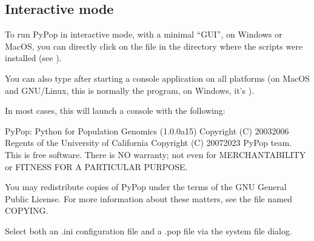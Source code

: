 \documentclass[letterpaper,10pt,english,openany,oneside]{sphinxmanual}
\begin{document}
\subsection{Interactive mode}
\label{\detokenize{docs/guide-chapter-usage:interactive-mode}}
\sphinxAtStartPar
To run PyPop in interactive mode, with a minimal “GUI”, on Windows or
MacOS, you can directly click on the  file in the
directory where the scripts were installed (see {\hyperref[\detokenize{docs/guide-chapter-install:post-install-path-adjustments}]{}}).

\sphinxAtStartPar
You can also type  after starting a console
application on all platforms (on MacOS and GNU/Linux, this is normally
the  program, on Windows, it’s ).

\sphinxAtStartPar
In most cases, this will launch a console with the following:

\begin{sphinxVerbatim}[commandchars=\\\{\}]
PyPop: Python for Population Genomics (1.0.0a15)
Copyright (C) 2003\PYGZhy{}2006 Regents of the University of California
Copyright (C) 2007\PYGZhy{}2023 PyPop team.
This is free software.  There is NO warranty; not even for
MERCHANTABILITY or FITNESS FOR A PARTICULAR PURPOSE.

You may redistribute copies of PyPop under the terms of the GNU
General Public License.  For more information about these
matters, see the file named COPYING.

Select both an \PYGZsq{}.ini\PYGZsq{} configuration file and a \PYGZsq{}.pop\PYGZsq{} file via the
system file dialog.
\end{sphinxVerbatim}
\end{document}

